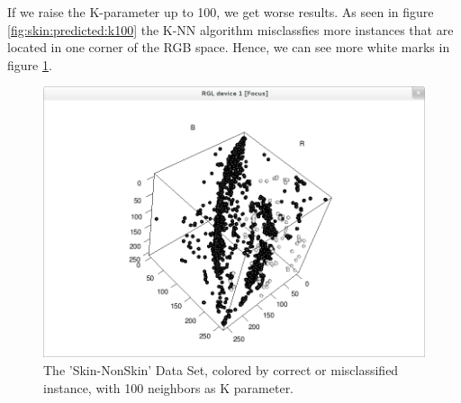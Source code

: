 \documentclass[paper=a4, fontsize=11pt]{scrartcl} %
\numberwithin{equation}{section} %
\numberwithin{figure}{section} %
\numberwithin{table}{section} %
\begin{document}
If we raise the K-parameter up to 100, we get worse results. As seen in figure \ref{fig:skin:predicted:k100} the K-NN algorithm misclassfies more instances that are located in one corner of the RGB space. Hence, we can see more white marks in figure \ref{fig:skin:correct:k100}.

\begin{figure}[\textwidth]
    \begin{center}
\includegraphics[width=\textwidth]{Skin_correct_k100}
    \end{center}
\caption['Skin-NonSkin' correctness with k=100]{The 'Skin-NonSkin' Data Set, colored by correct or misclassified instance, with 100 neighbors as K parameter.}
\label{fig:skin:correct:k100}
\end{figure}
\end{document}
